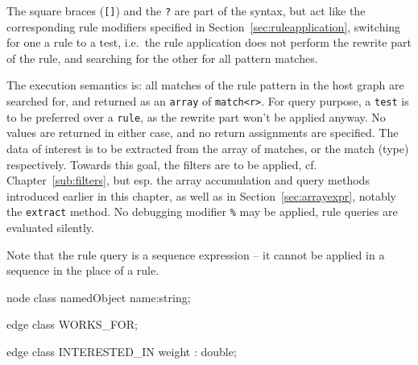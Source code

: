 The square braces (\texttt{[]}) and the \texttt{?} are part of the syntax, but act like the corresponding rule modifiers specified in Section~\ref{sec:ruleapplication}, switching for one a rule to a test, i.e.\ the rule application does not perform the rewrite part of the rule, and searching for the other for all pattern matches.

The execution semantics is: all matches of the rule pattern in the host graph are searched for, and returned as an \texttt{array} of \texttt{match<r>}.
For query purpose, a \texttt{test} is to be preferred over a \texttt{rule}, as the rewrite part won't be applied anyway. 
No values are returned in either case, and no return assignments are specified.
The data of interest is to be extracted from the array of matches, or the match (type) respectively.
Towards this goal, the filters are to be applied, cf. Chapter~\ref{sub:filters}, but esp. the array accumulation and query methods introduced earlier in this chapter, as well as in Section~\ref{sec:arrayexpr}, notably the \texttt{extract} method.
No debugging modifier \texttt{\%} may be applied, rule queries are evaluated silently.

Note that the rule query is a sequence expression -- it cannot be applied in a sequence in the place of a rule.

\begin{example}
  \begin{grgen}
node class namedObject
{
	name:string;
}

edge class WORKS_FOR;

edge class INTERESTED_IN
{
	weight : double;
}
  \end{grgen}
\end{example}


